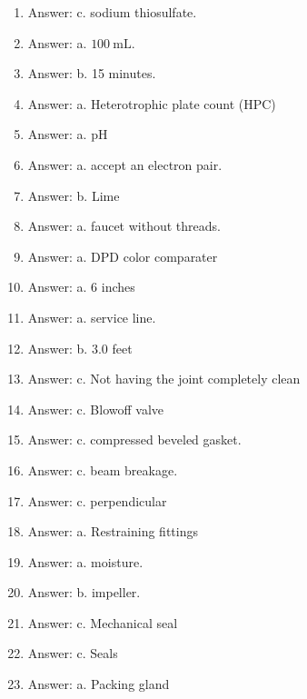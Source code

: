 \documentclass[10pt]{article}
\begin{document}
\begin{enumerate}
  \item Answer: c. sodium thiosulfate.

  \item Answer: a. $100 \mathrm{~mL}$.

  \item Answer: b. 15 minutes.

  \item Answer: a. Heterotrophic plate count (HPC)

  \item Answer: a. $\mathrm{pH}$

  \item Answer: a. accept an electron pair.

  \item Answer: b. Lime

  \item Answer: a. faucet without threads.

  \item Answer: a. DPD color comparater

  \item Answer: a. 6 inches

  \item Answer: a. service line.

  \item Answer: b. $3.0$ feet

  \item Answer: c. Not having the joint completely clean

  \item Answer: c. Blowoff valve

  \item Answer: c. compressed beveled gasket.

  \item Answer: c. beam breakage.

  \item Answer: c. perpendicular

  \item Answer: a. Restraining fittings

  \item Answer: a. moisture.

  \item Answer: b. impeller.

  \item Answer: c. Mechanical seal

  \item Answer: c. Seals

  \item Answer: a. Packing gland


\end{enumerate}
\end{document}
